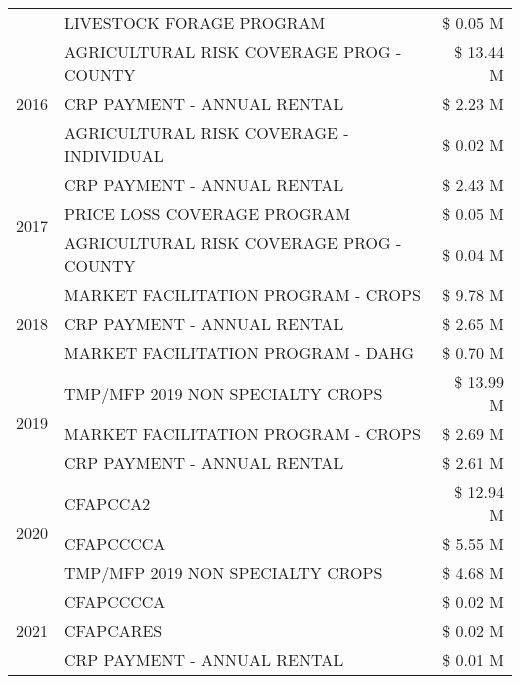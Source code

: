 \begin{tabular}{llr}
 & LIVESTOCK FORAGE PROGRAM & \$ 0.05 M \\
\cline{1-3}
\multirow[t]{3}{*}{2016} & AGRICULTURAL RISK COVERAGE PROG - COUNTY & \$ 13.44 M \\
 & CRP PAYMENT - ANNUAL RENTAL & \$ 2.23 M \\
 & AGRICULTURAL RISK COVERAGE - INDIVIDUAL & \$ 0.02 M \\
\cline{1-3}
\multirow[t]{3}{*}{2017} & CRP PAYMENT - ANNUAL RENTAL & \$ 2.43 M \\
 & PRICE LOSS COVERAGE PROGRAM & \$ 0.05 M \\
 & AGRICULTURAL RISK COVERAGE PROG - COUNTY & \$ 0.04 M \\
\cline{1-3}
\multirow[t]{3}{*}{2018} & MARKET FACILITATION PROGRAM - CROPS & \$ 9.78 M \\
 & CRP PAYMENT - ANNUAL RENTAL & \$ 2.65 M \\
 & MARKET FACILITATION PROGRAM - DAHG & \$ 0.70 M \\
\cline{1-3}
\multirow[t]{3}{*}{2019} & TMP/MFP 2019 NON SPECIALTY CROPS & \$ 13.99 M \\
 & MARKET FACILITATION PROGRAM - CROPS & \$ 2.69 M \\
 & CRP PAYMENT - ANNUAL RENTAL & \$ 2.61 M \\
\cline{1-3}
\multirow[t]{3}{*}{2020} & CFAPCCA2 & \$ 12.94 M \\
 & CFAPCCCCA & \$ 5.55 M \\
 & TMP/MFP 2019 NON SPECIALTY CROPS & \$ 4.68 M \\
\cline{1-3}
\multirow[t]{3}{*}{2021} & CFAPCCCCA & \$ 0.02 M \\
 & CFAPCARES & \$ 0.02 M \\
 & CRP PAYMENT - ANNUAL RENTAL & \$ 0.01 M \\
\cline{1-3}
\bottomrule
\end{tabular}
